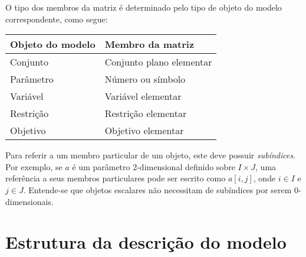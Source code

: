 \documentclass[11pt, brazil]{report}
\begin{document}

O tipo dos membros da matriz é determinado pelo tipo de objeto do modelo
correspondente, como segue:

\medskip

\noindent\hfil
\begin{tabular}{@{}ll@{}}
Objeto do modelo&Membro da matriz\\
\hline
Conjunto&Conjunto plano elementar\\
Parâmetro&Número ou símbolo\\
Variável&Variável elementar\\
Restrição&Restrição elementar\\
Objetivo&Objetivo elementar\\
\end{tabular}

\medskip

Para referir a um membro particular de um objeto, este deve possuir
{\it subíndices}. Por exemplo, se $a$ é um parâmetro 2-dimensional
definido sobre $I\times J$, uma referência a seus membros particulares
pode ser escrito como $a[i,j]$, onde $i\in I$ e $j\in J$. Entende-se
que objetos escalares não necessitam de subíndices por serem 0-dimensionais.


\section{Estrutura da descrição do modelo}
\end{document}
